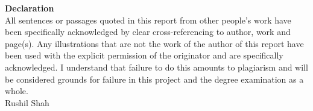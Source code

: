 \documentclass[../main.tex]{subfiles}
\begin{document}
\raggedright


\textbf{{\Huge Declaration}}\\[8mm]


All sentences or passages quoted in this report from other people's work have been specifically acknowledged by clear cross-referencing to author, work and page(s). Any illustrations that are not the work of the author of this report have been used with the explicit permission of the originator and are specifically acknowledged. I understand that failure to do this amounts to plagiarism and will be considered grounds for failure in this project and the degree examination as a whole.\\[16mm]
Rushil Shah
\end{document}
